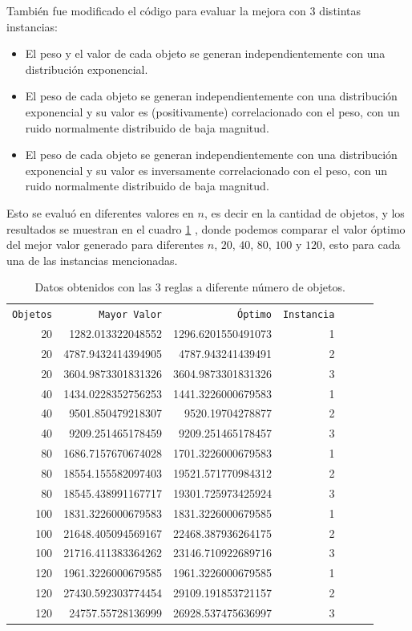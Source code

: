 \documentclass{article}
\begin{document}
Tambi\'en fue modificado el c\'odigo \citep{ana} para evaluar la mejora con $3$ distintas instancias:
\begin{itemize} \item El peso y el valor de cada objeto se generan independientemente con una distribuci\'on exponencial. \item El peso de cada objeto se generan independientemente con una distribuci\'on exponencial y su valor es (positivamente) correlacionado con el peso, con un ruido normalmente distribuido de baja magnitud. \item El peso de cada objeto se generan independientemente con una distribuci\'on exponencial y su valor es inversamente correlacionado con el peso, con un ruido normalmente distribuido de baja magnitud.
\end{itemize}

Esto se evalu\'o en diferentes valores en $n$, es decir en la cantidad de objetos, y los resultados se muestran en el cuadro \ref{t1} , donde podemos comparar el valor \'optimo del mejor valor generado para diferentes $n$, $20$, $40$, $80$, $100$ y $120$, esto para cada una de las instancias mencionadas.

\begin{table} [H]
 \caption{Datos obtenidos con las 3 reglas a diferente n\'umero de objetos.}
 \label{t1}
 \begin{center}
 \begin{tabular}{rrrrrrr}
\texttt{Objetos} & \texttt{Mayor Valor} & \texttt{\'Optimo} &\texttt{Instancia} \\
20  & 1282.013322048552   & 1296.6201550491073  & 1  \\ 
20  & 4787.9432414394905 & 4787.943241439491    & 2\\ 
20  & 3604.9873301831326 & 3604.9873301831326  & 3  \\ 
40  &1434.0228352756253  &1441.3226000679583  & 1   \\ 
40  & 9501.850479218307   &9520.19704278877 & 2 \\ 
40  & 9209.251465178459   &9209.251465178457  & 3   \\ 
80  & 1686.7157670674028 & 1701.3226000679583 & 1 \\ 
80  & 18554.155582097403 & 19521.571770984312 & 2  \\ 
80  &18545.438991167717  &19301.725973425924  & 3  \\ 
100 & 1831.3226000679583&1831.3226000679585  & 1  \\ 
100 & 21648.405094569167&22468.387936264175  & 2   \\ 
100 & 21716.411383364262& 23146.710922689716  & 3 \\ 
120 & 1961.3226000679585& 1961.3226000679585  & 1  \\ 
120 &27430.592303774454 &29109.191853721157  & 2  \\ 
120 &24757.55728136999   &26928.537475636997 & 3  \\ 

\end{tabular}
\end{center}
\end{table}
\end{document}
